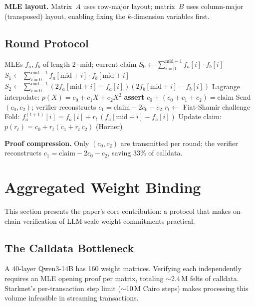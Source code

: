 \documentclass[10pt,twocolumn]{article}
\theoremstyle{definition}
\theoremstyle{remark}
\begin{document}
\textbf{MLE layout.}
Matrix~$A$ uses row-major layout; matrix~$B$ uses column-major
(transposed) layout, enabling fixing the $k$-dimension variables first.

\subsection{Round Protocol}

\begin{algorithm}[t]
\caption{Sumcheck round for MatMul verification}
\label{alg:sumcheck}
\begin{algorithmic}[1]
\Require MLEs $f_a, f_b$ of length $2\cdot\mathrm{mid}$; current claim
\State $S_0 \leftarrow \sum_{i=0}^{\mathrm{mid}-1} f_a[i] \cdot f_b[i]$
\State $S_1 \leftarrow \sum_{i=0}^{\mathrm{mid}-1}
  f_a[\mathrm{mid}+i] \cdot f_b[\mathrm{mid}+i]$
\State $S_2 \leftarrow \sum_{i=0}^{\mathrm{mid}-1}
  (2f_a[\mathrm{mid}+i] - f_a[i])
  (2f_b[\mathrm{mid}+i] - f_b[i])$
\State Lagrange interpolate: $p(X) = c_0 + c_1 X + c_2 X^2$
\State \textbf{assert} $c_0 + (c_0+c_1+c_2) = \text{claim}$
\State Send $(c_0, c_2)$; verifier reconstructs
  $c_1 = \text{claim} - 2c_0 - c_2$
\State $r_t \leftarrow$ Fiat-Shamir challenge
\State Fold: $f_a^{(t+1)}[i] = f_a[i] + r_t\,(f_a[\mathrm{mid}+i]-f_a[i])$
\State Update claim: $p(r_t) = c_0 + r_t(c_1 + r_t\,c_2)$ (Horner)
\end{algorithmic}
\end{algorithm}

\textbf{Proof compression.}
Only $(c_0,c_2)$ are transmitted per round; the verifier reconstructs
$c_1 = \text{claim} - 2c_0 - c_2$, saving 33\% of calldata.


\section{Aggregated Weight Binding}\label{sec:binding}

This section presents the paper's core contribution: a protocol that
makes on-chain verification of LLM-scale weight commitments practical.

\subsection{The Calldata Bottleneck}

A 40-layer Qwen3-14B has 160 weight matrices.
Verifying each independently requires an MLE opening proof per matrix,
totaling $\sim$2.4\,M felts of calldata.
Starknet's per-transaction step limit ($\sim$10\,M Cairo steps) makes
processing this volume infeasible in streaming transactions.
\end{document}
